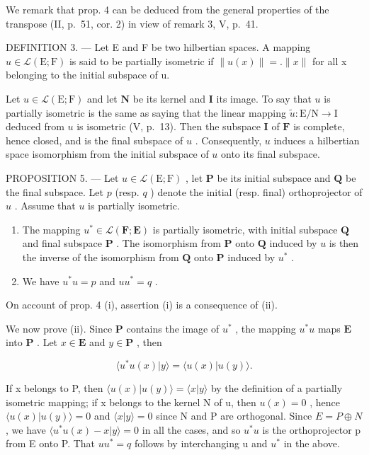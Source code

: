 We remark that prop. 4 can be deduced from the general properties of the transpose (II, p.~51, cor. 2) in view of remark 3, V, p.~41.

DEFINITION 3. --- Let E and F be two hilbertian spaces. A mapping \(u \in \mathcal{L}(\mathrm{E};\mathrm{F})\) is said to be partially isometric if \(\|u(x)\| = .\|x\|\) for all x belonging to the initial subspace of u.

Let \(u \in \mathcal{L}(\mathrm{E};\mathrm{F})\) and let \(\mathbf{N}\) be its kernel and \(\mathbf{I}\) its image. To say that \(u\) is partially isometric is the same as saying that the linear mapping \(\tilde{u}: \mathrm{E/N} \to \mathrm{I}\) deduced from \(u\) is isometric (V, p.~13). Then the subspace \(\mathbf{I}\) of \(\mathbf{F}\) is complete, hence closed, and is the final subspace of \(u\) . Consequently, \(u\) induces a hilbertian space isomorphism from the initial subspace of \(u\) onto its final subspace.

PROPOSITION 5. --- Let \(u \in \mathcal{L}(\mathrm{E};\mathrm{F})\) , let \(\mathbf{P}\) be its initial subspace and \(\mathbf{Q}\) be the final subspace. Let \(p\) (resp. \(q\) ) denote the initial (resp. final) orthoprojector of \(u\) . Assume that \(u\) is partially isometric.

\begin{enumerate}
\def\labelenumi{(\roman{enumi})}
\item
  The mapping \(u^{*} \in \mathcal{L}(\mathbf{F};\mathbf{E})\) is partially isometric, with initial subspace \(\mathbf{Q}\) and final subspace \(\mathbf{P}\) . The isomorphism from \(\mathbf{P}\) onto \(\mathbf{Q}\) induced by \(u\) is then the inverse of the isomorphism from \(\mathbf{Q}\) onto \(\mathbf{P}\) induced by \(u^{*}\) .
\item
  We have \(u^{*}u = p\) and \(uu^{*} = q\) .
\end{enumerate}

On account of prop. 4 (i), assertion (i) is a consequence of (ii).

We now prove (ii). Since \(\mathbf{P}\) contains the image of \(u^{*}\) , the mapping \(u^{*}u\) maps \(\mathbf{E}\) into \(\mathbf{P}\) . Let \(x \in \mathbf{E}\) and \(y \in \mathbf{P}\) , then

\[
\langle u ^ {*} u (x) | y \rangle = \langle u (x) | u (y) \rangle .
\]

If x belongs to P, then \(\langle u(x)|u(y)\rangle = \langle x|y\rangle\) by the definition of a partially isometric mapping; if x belongs to the kernel N of u, then \(u(x) = 0\) , hence \(\langle u(x)|u(y)\rangle = 0\) and \(\langle x|y\rangle = 0\) since N and P are orthogonal. Since \(E = P \oplus N\) , we have \(\langle u^{*}u(x) - x|y\rangle = 0\) in all the cases, and so \(u^{*}u\) is the orthoprojector p from E onto P. That \(uu^{*} = q\) follows by interchanging u and \(u^{*}\) in the above.

